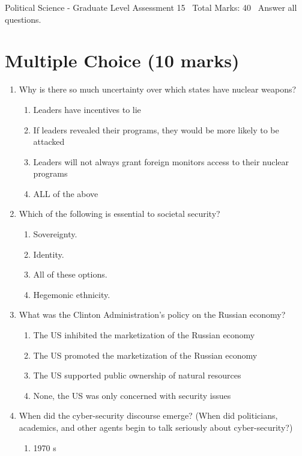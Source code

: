 \documentclass[12pt]{article}
\begin{document}
\begin{center}
Political Science - Graduate Level Assessment 15 \
Total Marks: 40 \
Answer all questions.
\end{center}

\section*{Multiple Choice (10 marks)}
\begin{enumerate}[label=\arabic*.]
\item Why is there so much uncertainty over which states have nuclear weapons?
\begin{enumerate}[label=(\alph*)]
    \item Leaders have incentives to lie
    \item If leaders revealed their programs, they would be more likely to be attacked
    \item Leaders will not always grant foreign monitors access to their nuclear programs
    \item ALL of the above
\end{enumerate}
\item Which of the following is essential to societal security?
\begin{enumerate}[label=(\alph*)]
    \item Sovereignty.
    \item Identity.
    \item All of these options.
    \item Hegemonic ethnicity.
\end{enumerate}
\item What was the Clinton Administration's policy on the Russian economy?
\begin{enumerate}[label=(\alph*)]
    \item The US inhibited the marketization of the Russian economy
    \item The US promoted the marketization of the Russian economy
    \item The US supported public ownership of natural resources
    \item None, the US was only concerned with security issues
\end{enumerate}
\item When did the cyber-security discourse emerge? (When did politicians, academics, and other agents begin to talk seriously about cyber-security?)
\begin{enumerate}[label=(\alph*)]
    \item 1970 s

\end{enumerate}
\end{enumerate}
\end{document}
